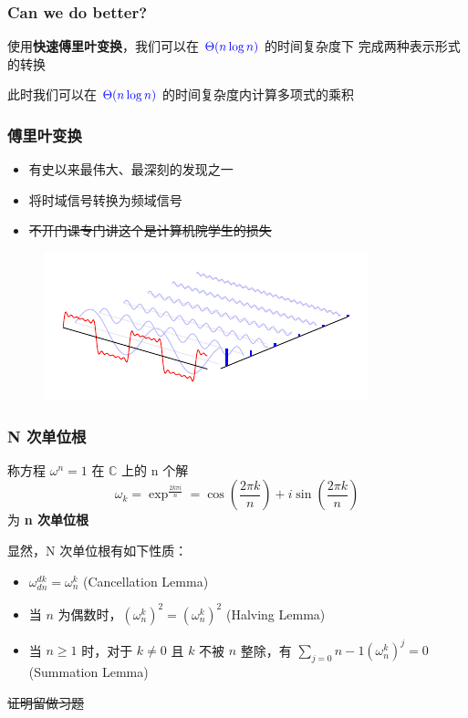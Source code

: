 \documentclass[UTF8]{ctexbeamer}
\begin{document}
\begin{frame}
    \frametitle{Can we do better?}
    使用\textbf{快速傅里叶变换}，我们可以在
    $\textcolor{blue}{\Theta(n \log n)}$ 的时间复杂度下
    完成两种表示形式的转换
 
    此时我们可以在 $\textcolor{blue}{\Theta(n \log n)}$
    的时间复杂度内计算多项式的乘积
\end{frame}

\begin{frame}
    \frametitle{傅里叶变换}
    \begin{itemize}
        \item 有史以来最伟大、最深刻的发现之一
        \item 将时域信号转换为频域信号
        \item \sout{不开门课专门讲这个是计算机院学生的损失}
    \end{itemize}
    \begin{figure}
        \includegraphics[width= 0.8\linewidth]{ft.pdf}
     \end{figure}
\end{frame}

\begin{frame}
    \frametitle{N 次单位根}
    \begin{block}{}
        称方程 $\omega^n = 1$ 在 $\mathbb{C}$ 上的 n 个解
        $$\omega_k = \exp^{\frac{2k\pi i}{n}} = \cos(\frac{2\pi k}{n}) + i \sin(\frac{2\pi k}{n})$$
        为 \textbf{n 次单位根}
    \end{block}
    显然，N 次单位根有如下性质：
    \begin{itemize}
        \item $\omega_{dn}^{dk} = \omega_{n}^{k}$ (Cancellation Lemma)
        \item 当 $n$ 为偶数时，$(\omega_n^k)^2 = (\omega_n^k)^2$ (Halving Lemma)
        \item 当 $n \geq 1$ 时，对于 $k \neq 0$ 且 $k$ 不被 $n$ 整除，有 
        $\sum_{j = 0}{n - 1} (\omega_n^k)^j = 0$ (Summation Lemma)
    \end{itemize}
    \begin{center}
        \sout{证明留做习题}
    \end{center}
\end{frame}
\end{document}
